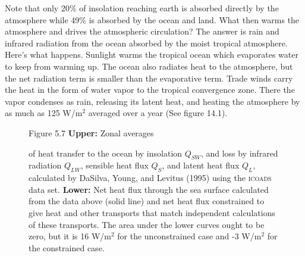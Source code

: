 Note that only 20\% of insolation
reaching earth is absorbed directly by the atmosphere while 49\% is
absorbed by the ocean and land. What then warms the atmosphere and
drives the atmospheric circulation? The answer is rain and infrared
radiation from the ocean absorbed by the moist tropical
atmosphere. Here's what happens. Sunlight warms the tropical ocean
which evaporates water to keep from warming up. The ocean also
radiates heat to the atmosphere, but the net radiation term is smaller
than the evaporative term. Trade winds carry the heat in the form of
water vapor to the tropical convergence zone. There the vapor
condenses as rain, releasing its latent heat, and heating the
atmosphere by as much as 125 W/m$^2$ averaged over a year (See figure
14.1).

\begin{figure}[b!]
\vspace{-2ex}
\footnotesize
Figure 5.7 \textbf{Upper:} Zonal averages \rule{0mm}{4ex}of heat
transfer to the ocean by insolation
$Q_{SW}$, and loss by infrared radiation $Q_{LW}$, sensible heat
flux $Q_S$, and latent heat
flux $Q_L$, calculated by DaSilva, Young, and Levitus (1995) using the
\textsc{icoads} data set.  \textbf{Lower:} Net heat flux through the
sea surface calculated from the data above (solid line) and net heat
flux constrained to give heat and other
transports that match independent calculations of these
transports. The area under the lower curves ought to be zero, but it
is 16 W/m$^2$ for the unconstrained case and -3 W/m$^2$ for the
constrained case.
\label{fig:zonalaveheat}
\end{figure}

